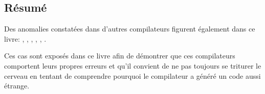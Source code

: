 \subsection{Résumé}

Des anomalies constatées dans d'autres compilateurs figurent également dans ce livre: 
, , ,
,
,
.

Ces cas sont exposés dans ce livre afin de démontrer que ces compilateurs comportent leurs propres 
erreurs et qu'il convient de ne pas toujours se triturer le cerveau en tentant de comprendre 
pourquoi le compilateur a généré un code aussi étrange.

